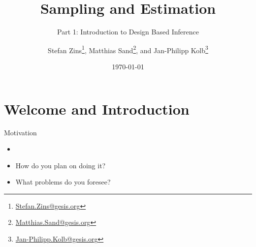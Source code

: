 \documentclass[10pt]{beamer}\usepackage[]{graphicx}\usepackage[]{color}
\newcommand\makebeamertitle{\frame{\maketitle}}%
\begin{document}




\title[Sampling Designs]{Sampling and Estimation}   
\subtitle{Part 1: Introduction to Design Based Inference}

\author{Stefan Zins\thanks{\href{mailto:Stefan.Zins@gesis.org}{Stefan.Zins@gesis.org}}, Matthias Sand\thanks{\href{mailto:Matthias.Sand@gesis.org}{Matthias.Sand@gesis.org}}, and Jan-Philipp Kolb\thanks{\href{mailto:Jan-Philipp.Kolb@gesis.org}{Jan-Philipp.Kolb@gesis.org}}}
\date{\today} 

\makebeamertitle

\section{Welcome and Introduction}


\begin{frame}{Motivation}

  \begin{itemize}
    \item<1-2,3->  
         \vspace{1cm}
    \item<3-> How do you plan on doing it?  \vspace{1cm}
    \item<4>  What problems do you foresee?
  \end{itemize}
\end{frame}
\end{document}
